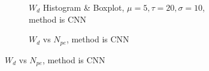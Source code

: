 \begin{figure}[H]
\begin{minipage}[t]{.5\textwidth}
\begin{figure}[H]
    \centering
    \resizebox{\textwidth}{!}{}
    \caption{\label{fig:cnn-hist} $W_{d}$ Histogram \& Boxplot, $\mu=5, \tau=20, \sigma=10$, method is CNN}
\end{figure}
\end{minipage}
\begin{minipage}[t]{.5\textwidth}
\begin{figure}[H]
    \centering
    \resizebox{\textwidth}{!}{}
    \caption{\label{fig:cnn-npe} $W_{d}$ vs $N_{pe}$, method is CNN}
\end{figure}
\end{minipage}
\end{figure}

